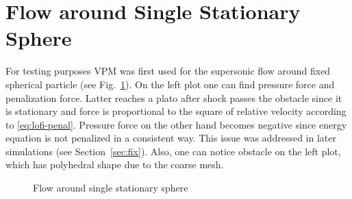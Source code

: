 \section{Flow around Single Stationary Sphere}
For testing purposes VPM was first used for the supersonic flow around fixed spherical particle (see Fig.~\ref{fig:lofi_single_stat}). On the left plot one can find pressure force and penalization force. Latter reaches a plato after shock passes the obstacle since it is stationary and force is proportional to the square of relative velocity according to \eqref{eq:lofi-penal}. Pressure force on the other hand becomes negative since energy equation is not penalized in a consistent way. This issue was addressed in later simulations (see Section~\ref{sec:fix}). Also, one can notice obstacle on the left plot, which has polyhedral shape due to the coarse mesh.
\begin{figure}[t]
\begin{minipage}{0.5\linewidth}
\end{minipage}
\begin{minipage}{0.5\linewidth}
\end{minipage}
\caption{Flow around single stationary sphere} \label{fig:lofi_single_stat}
\end{figure}

